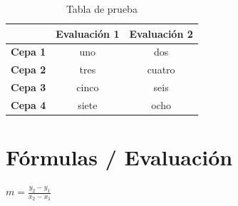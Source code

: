 \documentclass[]{article}
\begin{document}
\begin{table}[!h]
	\centering
	\caption{Tabla de prueba}
	\label{tab1}
	
		\begin{tabular}{c|c|c|}
			\cline{2-3}
			
			& \textbf{Evaluación 1} & \textbf{Evaluación 2} \\ \hline
			
			\multicolumn{1}{|c|}{\textbf{Cepa 1}} &   uno                     &          dos             \\ \hline
			\multicolumn{1}{|c|}{\textbf{Cepa 2}} &   tres                    &          cuatro             \\ \hline
			\multicolumn{1}{|c|}{\textbf{Cepa 3}} &      cinco                 &          seis             \\ \hline
			\multicolumn{1}{|c|}{\textbf{Cepa 4}} &         siete              &      ocho                 \\ \hline
		\end{tabular}%
	
\end{table}


\section{Fórmulas / Evaluación}

$m=\frac{y_2-y_1}{x_2-x_1}$




\end{document}
